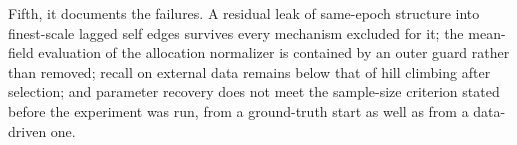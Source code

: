 Fifth, it documents the failures. A residual leak of same-epoch structure into
finest-scale lagged self edges survives every mechanism excluded for it; the
mean-field evaluation of the allocation normalizer is contained by an outer
guard rather than removed; recall on external data remains below that of hill
climbing after selection; and parameter recovery does not meet the sample-size
criterion stated before the experiment was run, from a ground-truth start as
well as from a data-driven one.
